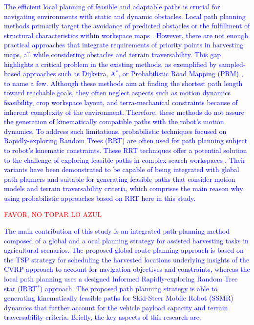 \documentclass[conference]{IEEEtran}
\newcommand{\revJ}[1]{\textcolor{red}{#1}}
\begin{document}
\textcolor{blue}{The efficient local planning of feasible and adaptable paths is crucial for navigating environments with static and dynamic obstacles. Local path planning methods primarily target the avoidance of predicted obstacles or the fulfillment of structural characteristics within workspace maps \cite{Pak2022, Tagliavini2022, Gan2018, 8715479}. However, there are not enough practical approaches that integrate requirements of priority points in harvesting maps, all while considering obstacles and terrain traversability. This gap highlights a critical problem in the existing methods, as exemplified by sampled-based approaches such as Dijkstra, A$^*$, or Probabilistic Road Mapping (PRM) \cite{Xu2020}, to name a few. Although these methods aim at finding the shortest path length toward reachable goals, they often neglect aspects such as motion dynamics feasibility, crop workspace layout, and terra-mechanical constraints because of inherent complexity of the environment. Therefore, these methods do not assure the generation of kinematically compatible paths with the robot's motion dynamics. To address such limitations, probabilistic techniques focused on Rapidly-exploring Random Trees (RRT) \cite{Mashayekhi2020, Kontoudis2019,Zhang2019,Denggui} are often used for path planning subject to robot's kinematic constraints. These RRT techniques offer a potential solution to the challenge of exploring feasible paths in complex search workspaces \cite{Xie2020}. Their variants have been demonstrated to be capable of being integrated with global path planners and suitable for generating feasible paths that consider motion models and terrain traversability criteria, which comprises the main reason why using probabilistic approaches based on RRT here in this study.}

\revJ{FAVOR, NO TOPAR LO AZUL}

\textcolor{blue}{The main contribution of this study is an integrated path-planning method composed of a global and a ocal planning strategy for assisted harvesting tasks in agricultural scenarios. The proposed global route planning approach is based on the TSP strategy for scheduling the harvested locations underlying insights of the CVRP approach to account for navigation objectives and constraints, whereas the local path planning uses a designed Informed Rapidly-exploring Random Tree star (IRRT$^*$) approach. The proposed path planning strategy is able to generating kinematically feasible paths for Skid-Steer Mobile Robot (SSMR) dynamics that further account for the vehicle payload capacity and terrain traversability criteria. Briefly, the key aspects of this research are:}
\end{document}
